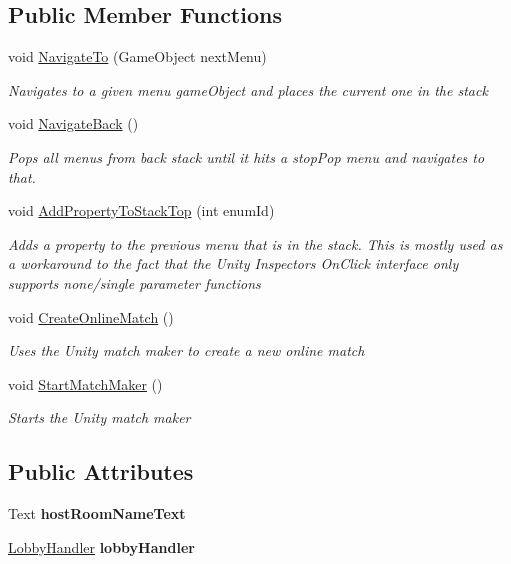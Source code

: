 \subsection*{Public Member Functions}
\begin{DoxyCompactItemize}
\item 
void \hyperlink{class_main_menu_handler_acfea2da02c568977d41b7401d6ce8a9b}{Navigate\+To} (Game\+Object next\+Menu)
\begin{DoxyCompactList}\small\item\em Navigates to a given menu game\+Object and places the current one in the stack \end{DoxyCompactList}\item 
void \hyperlink{class_main_menu_handler_ad04a18db3433e914aae5646267bf07ed}{Navigate\+Back} ()
\begin{DoxyCompactList}\small\item\em Pops all menus from back stack until it hits a stop\+Pop menu and navigates to that. \end{DoxyCompactList}\item 
void \hyperlink{class_main_menu_handler_a47d8fcef1366d4c7f4979bea63dcb95f}{Add\+Property\+To\+Stack\+Top} (int enum\+Id)
\begin{DoxyCompactList}\small\item\em Adds a property to the previous menu that is in the stack. This is mostly used as a workaround to the fact that the Unity Inspector\textquotesingle{}s On\+Click interface only supports none/single parameter functions \end{DoxyCompactList}\item 
void \hyperlink{class_main_menu_handler_adf1c89669b528be6a27f7ac9f7fb0696}{Create\+Online\+Match} ()
\begin{DoxyCompactList}\small\item\em Uses the Unity match maker to create a new online match \end{DoxyCompactList}\item 
void \hyperlink{class_main_menu_handler_a7729dec8dd126e78db4d7fd857aeb14b}{Start\+Match\+Maker} ()
\begin{DoxyCompactList}\small\item\em Starts the Unity match maker \end{DoxyCompactList}\end{DoxyCompactItemize}
\subsection*{Public Attributes}
\begin{DoxyCompactItemize}
\item 
\hypertarget{class_main_menu_handler_a880ef39aa8b035e5831e3858c8acc72a}{}\label{class_main_menu_handler_a880ef39aa8b035e5831e3858c8acc72a} 
Text {\bfseries host\+Room\+Name\+Text}
\item 
\hypertarget{class_main_menu_handler_abfcf91e2d60be21d7e392192943b899d}{}\label{class_main_menu_handler_abfcf91e2d60be21d7e392192943b899d} 
\hyperlink{class_lobby_handler}{Lobby\+Handler} {\bfseries lobby\+Handler}
\end{DoxyCompactItemize}
